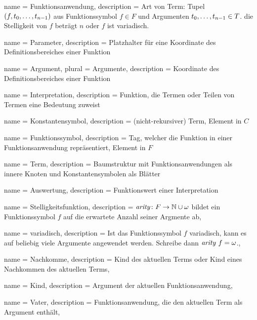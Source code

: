 

\makeglossaries

{
    name = {Funktionsanwendung},
    description = {Art von Term: Tupel $(f, {t}_{0}, \dots, {t}_{n-1})$ aus Funktionssymbol ${f \in F}$ und Argumenten ${{t}_{0}, \dots, {t}_{n-1} \in T}$. die Stelligkeit von $f$ beträgt $n$ oder $f$ ist variadisch.}
}

{
    name = Parameter,
    description = {Platzhalter für eine Koordinate des Definitionsbereiches einer Funktion}
}

{
    name = Argument,
    plural = Argumente,
    description = {Koordinate des Definitionsbereiches einer Funktion}
}

{
    name = Interpretation,
    description = {Funktion, die Termen oder Teilen von Termen eine Bedeutung zuweist}
}

{
    name = Konstantensymbol,
    description = {(nicht-rekursiver) Term, Element in $C$}
}

{
    name = Funktionssymbol,
    description = {Tag, welcher die Funktion in einer Funktionsanwendung repräsentiert, Element in $F$}
}

{
    name = Term,
    description = {Baumstruktur mit Funktionsanwendungen als innere Knoten und Konstantensymbolen als Blätter}
}

{
    name = Auswertung,
    description = {Funktionswert einer Interpretation}
}

{
    name = Stelligkeitsfunktion,
    description = {$\mathit{arity} \colon F \rightarrow \mathbb N \cup \omega$ bildet ein Funktionssymbol $f$ auf die erwartete Anzahl seiner Argmente ab},
}

{
    name = variadisch,
    description = {Ist das Funktionssymbol $f$ variadisch, kann es auf beliebig viele Argumente angewendet werden. Schreibe dann $\mathit{arity}~f = \omega$.},
}

{
    name = Nachkomme,
    description = {Kind des aktuellen Terms oder Kind eines Nachkommen des aktuellen Terms},
}

{
    name = Kind,
    description = {Argument der aktuellen Funktionsanwendung},
}


{
    name = Vater,
    description = {Funktionsanwendung, die den aktuellen Term als Argument enthält},
}

